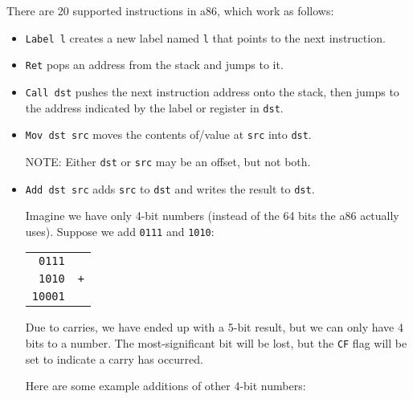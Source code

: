 \documentclass{article}
\newcommand{\lang}{a86}
\begin{document}
There are 20 supported instructions in \lang{}, which work as follows:

{\renewcommand\labelitemii{}\renewcommand\labelitemiii{}
  \begin{itemize}
  \item \texttt{Label l} creates a new label named \texttt{l} that points to the
    next instruction.
  \item \texttt{Ret} pops an address from the stack and jumps to it.
  \item \texttt{Call dst} pushes the next instruction address onto the stack,
    then jumps to the address indicated by the label or register in
    \texttt{dst}.
  \item \texttt{Mov dst src} moves the contents of/value at \texttt{src} into
    \texttt{dst}.

    NOTE: Either \texttt{dst} or \texttt{src} may be an offset, but not both.
  \item \texttt{Add dst src} adds \texttt{src} to \texttt{dst} and writes the
    result to \texttt{dst}.

    Imagine we have only 4-bit numbers (instead of the 64 bits the \lang{}
    actually uses). Suppose we add \texttt{0111} and \texttt{1010}:

    \begin{center}
      \begin{tabular}{rl}
        \texttt{0111} \\
        \texttt{1010} & \texttt{+} \\
        \hline
        \texttt{10001}
      \end{tabular}
    \end{center}

    Due to carries, we have ended up with a 5-bit result, but we can only have 4
    bits to a number. The most-significant bit will be lost, but the \texttt{CF}
    flag will be set to indicate a carry has occurred.

    Here are some example additions of other 4-bit numbers:


\end{itemize}}
\end{document}
